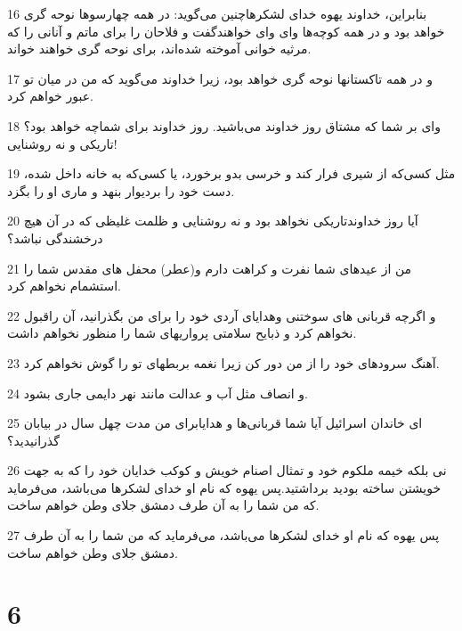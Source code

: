 \par 16 بنابراین، خداوند یهوه خدای لشکرهاچنین می‌گوید: در همه چهارسوها نوحه گری خواهد بود و در همه کوچه‌ها وای وای خواهندگفت و فلاحان را برای ماتم و آنانی را که مرثیه خوانی آموخته شده‌اند، برای نوحه گری خواهند خواند.
\par 17 و در همه تاکستانها نوحه گری خواهد بود، زیرا خداوند می‌گوید که من در میان تو عبور خواهم کرد.
\par 18 وای بر شما که مشتاق روز خداوند می‌باشید. روز خداوند برای شماچه خواهد بود؟ تاریکی و نه روشنایی!
\par 19 مثل کسی‌که از شیری فرار کند و خرسی بدو برخورد، یا کسی‌که به خانه داخل شده، دست خود را بردیوار بنهد و ماری او را بگزد.
\par 20 آیا روز خداوندتاریکی نخواهد بود و نه روشنایی و ظلمت غلیظی که در آن هیچ درخشندگی نباشد؟
\par 21 من از عیدهای شما نفرت و کراهت دارم و(عطر) محفل های مقدس شما را استشمام نخواهم کرد.
\par 22 و اگر‌چه قربانی های سوختنی وهدایای آردی خود را برای من بگذرانید، آن راقبول نخواهم کرد و ذبایح سلامتی پرواریهای شما را منظور نخواهم داشت.
\par 23 آهنگ سرودهای خود را از من دور کن زیرا نغمه بربطهای تو را گوش نخواهم کرد.
\par 24 و انصاف مثل آب و عدالت مانند نهر دایمی جاری بشود.
\par 25 ‌ای خاندان اسرائیل آیا شما قربانی‌ها و هدایابرای من مدت چهل سال در بیابان گذرانیدید؟
\par 26 نی بلکه خیمه ملکوم خود و تمثال اصنام خویش و کوکب خدایان خود را که به جهت خویشتن ساخته بودید برداشتید.پس یهوه که نام او خدای لشکرها می‌باشد، می‌فرماید که من شما را به آن طرف دمشق جلای وطن خواهم ساخت.
\par 27 پس یهوه که نام او خدای لشکرها می‌باشد، می‌فرماید که من شما را به آن طرف دمشق جلای وطن خواهم ساخت.

\chapter{6}

